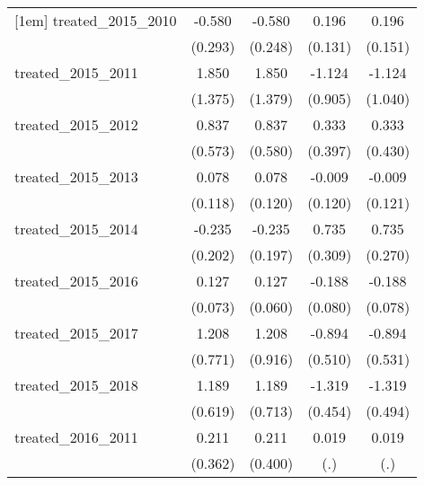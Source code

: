 {\begin{tabular}{l*{4}{c}}
[1em]
treated\_2015\_2010&      -0.580\sym{*}  &      -0.580\sym{*}  &       0.196         &       0.196         \\
            &     (0.293)         &     (0.248)         &     (0.131)         &     (0.151)         \\
[1em]
treated\_2015\_2011&       1.850         &       1.850         &      -1.124         &      -1.124         \\
            &     (1.375)         &     (1.379)         &     (0.905)         &     (1.040)         \\
[1em]
treated\_2015\_2012&       0.837         &       0.837         &       0.333         &       0.333         \\
            &     (0.573)         &     (0.580)         &     (0.397)         &     (0.430)         \\
[1em]
treated\_2015\_2013&       0.078         &       0.078         &      -0.009         &      -0.009         \\
            &     (0.118)         &     (0.120)         &     (0.120)         &     (0.121)         \\
[1em]
treated\_2015\_2014&      -0.235         &      -0.235         &       0.735\sym{*}  &       0.735\sym{**} \\
            &     (0.202)         &     (0.197)         &     (0.309)         &     (0.270)         \\
[1em]
treated\_2015\_2016&       0.127         &       0.127\sym{*}  &      -0.188\sym{*}  &      -0.188\sym{*}  \\
            &     (0.073)         &     (0.060)         &     (0.080)         &     (0.078)         \\
[1em]
treated\_2015\_2017&       1.208         &       1.208         &      -0.894         &      -0.894         \\
            &     (0.771)         &     (0.916)         &     (0.510)         &     (0.531)         \\
[1em]
treated\_2015\_2018&       1.189         &       1.189         &      -1.319\sym{**} &      -1.319\sym{**} \\
            &     (0.619)         &     (0.713)         &     (0.454)         &     (0.494)         \\
[1em]
treated\_2016\_2011&       0.211         &       0.211         &       0.019         &       0.019         \\
            &     (0.362)         &     (0.400)         &         (.)         &         (.)         \\

\end{tabular}}
